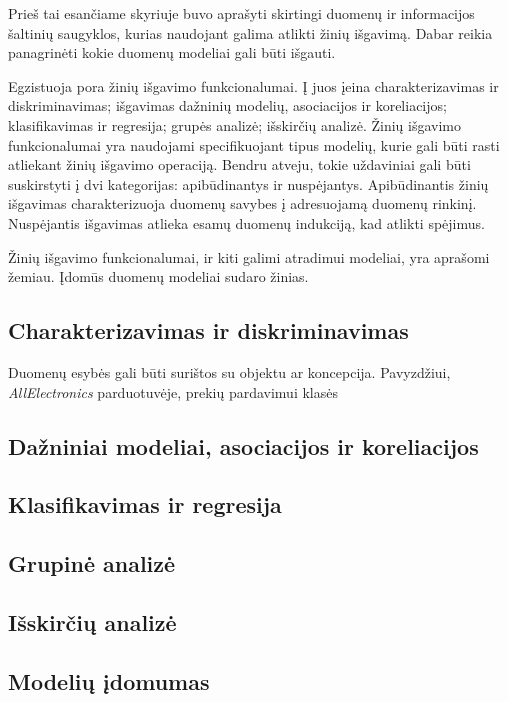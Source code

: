 Prieš tai esančiame skyriuje buvo aprašyti skirtingi duomenų ir informacijos šaltinių saugyklos, kurias naudojant galima atlikti žinių išgavimą.
Dabar reikia panagrinėti kokie duomenų modeliai gali būti išgauti.

Egzistuoja pora žinių išgavimo funkcionalumai. 
Į juos įeina charakterizavimas ir diskriminavimas; išgavimas dažninių modelių, asociacijos ir koreliacijos; klasifikavimas ir regresija; grupės analizė; išskirčių analizė.
Žinių išgavimo funkcionalumai yra naudojami specifikuojant tipus modelių, kurie gali būti rasti atliekant žinių išgavimo operaciją.
Bendru atveju, tokie uždaviniai gali būti suskirstyti į dvi kategorijas: apibūdinantys ir nuspėjantys.
Apibūdinantis žinių išgavimas charakterizuoja duomenų savybes į adresuojamą duomenų rinkinį.
Nuspėjantis išgavimas atlieka esamų duomenų indukciją, kad atlikti spėjimus.

Žinių išgavimo funkcionalumai, ir kiti galimi atradimui modeliai, yra aprašomi žemiau. Įdomūs duomenų modeliai sudaro žinias.

\subsection{Charakterizavimas ir diskriminavimas}

Duomenų esybės gali būti surištos su objektu ar koncepcija.
Pavyzdžiui, \textit{AllElectronics} parduotuvėje, prekių pardavimui klasės 

\subsection{Dažniniai modeliai, asociacijos ir koreliacijos}

\subsection{Klasifikavimas ir regresija}

\subsection{Grupinė analizė}

\subsection{Išskirčių analizė}

\subsection{Modelių įdomumas}